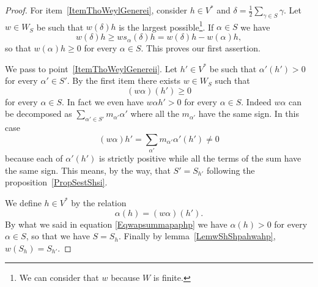 \begin{proof}
	For item~\ref{ItemThoWeylGenerei}, consider \( h\in V^*\) and \( \delta=\frac{ 1 }{2}\sum_{\gamma\in S}\gamma\). Let \( w\in W_S\) be such that \( w(\delta)h\) is the largest possible\footnote{We can consider that \( w\) because \( W\) is finite.}. If \( \alpha\in S\) we have
	\begin{equation}
		w(\delta)h\geq ws_{\alpha}(\delta)h=w(\delta)h-w(\alpha)h,
	\end{equation}
	so that \( w(\alpha)h\geq 0\) for every \( \alpha\in S\). This proves our first assertion.

	We pass to point~\ref{ItemThoWeylGenereii}. Let \( h'\in V^*\) be such that \( \alpha'(h')> 0\) for every \( \alpha'\in S'\). By the first item there exists \( w\in W_S\) such that
	\begin{equation}
		(w\alpha)(h')\geq 0
	\end{equation}
	for every \( \alpha\in S\). In fact we even have \( w\alpha h'>0\) for every \( \alpha\in S\). Indeed \( w\alpha\) can be decomposed as \( \sum_{\alpha'\in S'}m_{\alpha'}\alpha'\) where all the \( m_{\alpha'}\) have the same sign. In this case
	\begin{equation}        \label{Eqwapsummapaphp}
		(w\alpha)h'=\sum_{\alpha'}m_{\alpha'}\alpha'(h')\neq 0
	\end{equation}
	because each of \( \alpha'(h')\) is strictly positive while all the terms of the sum have the same sign. This means, by the way, that \( S'=S_{h'}\) following the proposition~\ref{PropSestShsi}.

	We define \( h\in V^*\) by the relation
	\begin{equation}
		\alpha(h)=(w\alpha)(h').
	\end{equation}
	By what we said in equation \eqref{Eqwapsummapaphp} we have \( \alpha(h)>0\) for every \( \alpha\in S\), so that we have \( S=S_h\). Finally by lemma~\ref{LemwShShpahwahp}, \( w(S_h)=S_{h'}\).


\end{proof}
